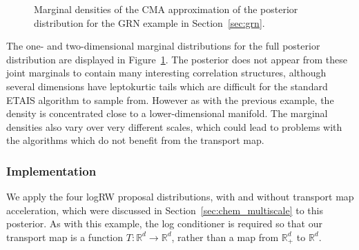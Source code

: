 \documentclass[final]{siamltex}
\newcommand{\edit}[1]{{\color{red} #1}}
\begin{document}
\begin{figure}[htb]
\centering
{}%
\caption{Marginal densities of the CMA approximation of the posterior
  distribution for the GRN example in Section~\ref{sec:grn}.}
\label{fig:GRN_posterior}
\end{figure}

The one- and two-dimensional marginal distributions for the full
posterior distribution are displayed in
Figure~\ref{fig:GRN_posterior}. The posterior does not appear from
these joint marginals to contain many
interesting correlation structures, although several dimensions have
leptokurtic tails which are difficult for the standard ETAIS algorithm
to sample from. However as with the previous example, the density is
concentrated close to a lower-dimensional manifold. The marginal densities also vary over very different
scales, which could lead to problems with the algorithms which do not
benefit from the transport map.

\subsubsection{Implementation}

We apply the \edit{four logRW} proposal distributions, with and
without transport map acceleration, which were discussed in
Section~\ref{sec:chem_multiscale} to this posterior. As with this
example, the log conditioner is required so that our transport map is a function $T\colon\mathbb{R}^d\rightarrow\mathbb{R}^d$, rather than a map from $\mathbb{R}_+^d$ to $\mathbb{R}^d$.
\end{document}
